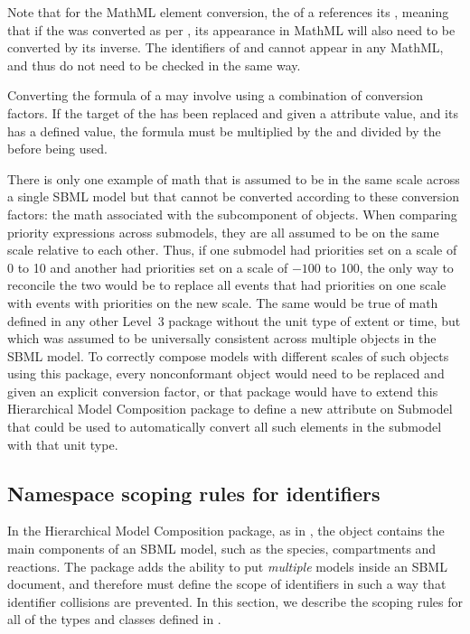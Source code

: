 Note that for the MathML  element conversion, the
 of a \Reaction references its \KineticLaw, meaning that if
the \KineticLaw was converted as per , its
appearance in MathML will also need to be converted by its inverse.  The
identifiers of \AssignmentRule and \RateRule cannot appear in any
MathML, and thus do not need to be checked in the same way.

Converting the formula of a \RateRule may involve using a combination of
conversion factors.  If the target of the \RateRule has been replaced
and given a  attribute value, and its \Submodel
has a defined  value, the formula must be
multiplied by the  and divided by the
 before being used.

There is only one example of math that is assumed to be in the same scale
across a single SBML model but that cannot be converted according to
these conversion factors:  the math associated with the \Priority
subcomponent of \Event objects.  When comparing priority expressions 
across submodels,
they are all assumed to be on the same scale relative to each other.
Thus, if one submodel had priorities set on a scale of 0 to 10 and another had
priorities set on a scale of $-100$ to 100, the only way to reconcile the 
two would be to replace all events that had priorities on one scale with
events with priorities on the new scale.
The same would be true of math defined in any other Level~3 package
without the unit type of extent or time, but which was assumed to
be universally consistent across multiple objects in the SBML model.
To correctly compose models with different scales of such objects using
this package, every nonconformant object would need to be replaced and
given an explicit conversion factor, or that package would have to
extend this Hierarchical Model Composition package to define a new
attribute on Submodel that could be used to automatically convert all
such elements in the submodel with that unit type.


\clearpage

\subsection{Namespace scoping rules for identifiers}
\label{namespaces}

In the Hierarchical Model Composition package, as in \sbmlthreecore,
the \Model object contains the main components of an
SBML model, such as the species, compartments and reactions.  The
package adds the ability to put \emph{multiple} models inside an SBML
document, and therefore must define the scope of identifiers in such a
way that identifier collisions are prevented.  In this section, we
describe the scoping rules for all of the types and classes defined in
.

